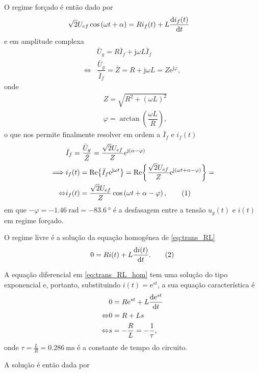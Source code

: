 \documentclass[a4paper, titlepage, portuguese]{article}
\newcommand{\eq}{\Leftrightarrow} %
\newcommand\numberthis{\addtocounter{equation}{1}\tag{\theequation}}
\newcommand\e{\mathrm{e} }
\newcommand\jj{\mathrm{j} }
\begin{document}
		\par
		O regime forçado é então dado por
		\begin{align*}
			&\sqrt{2}U_{ef}\cos\left(\omega t + \alpha\right) = Ri_f(t) + L \dv{i_f(t)}{t}
		\end{align*}
		e em amplitude complexa
		\begin{align*}
			&\bar{U}_g = R\bar{I}_f + \jj \omega L\bar{I}_f \\ \eq
			&\dfrac{\bar{U}_g}{\bar{I}_f} = \bar{Z} = R + \jj \omega L = Z\e^{\jj\varphi},
		\end{align*}
		onde
		\begin{align*}
			&Z = \sqrt{R^2 + (\omega L)^2} \\
			&\varphi = \arctan\left(\dfrac{\omega L}{R}\right),
		\end{align*}
		o que nos permite finalmente resolver em ordem a $\bar{I}_f$ e $i_f(t)$
		\begin{align*}
			&\bar{I}_f = \dfrac{\bar{U}_g}{\bar{Z}} = \dfrac{\sqrt{2}U_{ef}}{Z} e^{\jj\left(\alpha - \varphi\right)} \\ \implies
			&i_f(t) = \Re{\bar{I}_f \e^{\jj \omega t}} = \Re{\dfrac{\sqrt{2}U_{ef}}{Z} \e^{\jj\left(\omega t + \alpha - \varphi\right)}} = \\ \eq
			&i_f(t) = \dfrac{\sqrt{2}U_{ef}}{Z} \cos\left(\omega t + \alpha - \varphi\right), \numberthis \label{eq:trans_RL_forc}
		\end{align*}
		em que $- \varphi = \SI{-1.46}{\radian} = \SI{-83.6}{\degree}$ é a desfasagem entre a tensão $u_g(t)$ e $i(t)$ em regime forçado.
		\par
		O regime livre é a solução da equação homogénea de \eqref{eq:trans_RL}
		\begin{align*}
			0 = R i(t) + L \dv{i(t)}{t}. \numberthis \label{eq:trans_RL_hom}
		\end{align*}
		\par
		A equação diferencial em \eqref{eq:trans_RL_hom} tem uma solução do tipo exponencial e, portanto, substituindo $i(t) = \e^{st}$, a sua equação característica é
		\begin{align*}
			&0 = R\e^{st} + L\dv{\e^{st}}{t} \\ \eq
			&0 = R + Ls \\ \eq
			&s = - \dfrac{R}{L} = - \dfrac{1}{\tau},
		\end{align*}
		onde $\tau = \frac{L}{R} = \SI{0.286}{\milli\second}$ é a constante de tempo do circuito.
		\par
		A solução é então dada por
\end{document}
